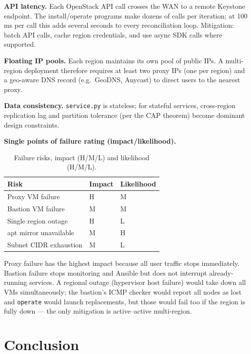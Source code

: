 \documentclass[conference]{IEEEtran}
\begin{document}
\textbf{API latency.}
Each OpenStack API call crosses the WAN to a remote Keystone endpoint.
The install/operate programs make dozens of calls per iteration;
at 100\,ms per call this adds several seconds to every reconciliation
loop.  Mitigation: batch API calls, cache region credentials, and use
async SDK calls where supported.

\textbf{Floating IP pools.}
Each region maintains its own pool of public IPs.  A multi-region
deployment therefore requires at least two proxy IPs (one per region)
and a geo-aware DNS record (e.g.\ GeoDNS, Anycast) to direct users to
the nearest proxy.

\textbf{Data consistency.}
\texttt{service.py} is stateless; for stateful services, cross-region
replication lag and partition tolerance (per the CAP theorem) become
dominant design constraints.

\textbf{Single points of failure rating (impact/likelihood).}

\begin{table}[ht]
\centering
\caption{Failure risks, impact (H/M/L) and likelihood (H/M/L).}
\label{tab:risk}
\begin{tabular}{@{}lll@{}}
\toprule
Risk & Impact & Likelihood \\
\midrule
Proxy VM failure       & H & M \\
Bastion VM failure     & M & M \\
Single region outage   & H & L \\
apt mirror unavailable & M & H \\
Subnet CIDR exhaustion & M & L \\
\bottomrule
\end{tabular}
\end{table}

\noindent
Proxy failure has the highest impact because all user traffic stops
immediately.  Bastion failure stops monitoring and Ansible but does
not interrupt already-running services.  A regional outage (hypervisor
host failure) would take down all VMs simultaneously; the bastion's
ICMP checker would report all nodes as lost and \texttt{operate} would
launch replacements, but those would fail too if the region is fully
down --- the only mitigation is active--active multi-region.

\section{Conclusion}
\label{sec:conclusion}
\end{document}
